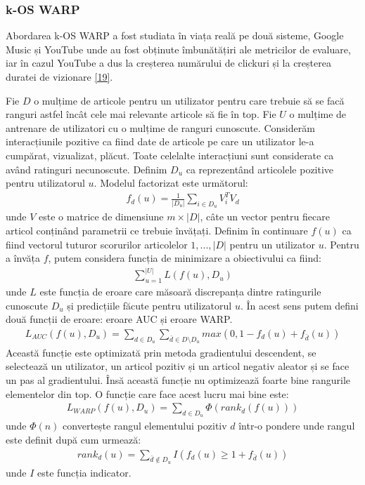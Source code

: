 \vspace{5mm}
\subsubsection*{k-OS WARP}
Abordarea k-OS WARP a fost studiata în viața reală pe două sisteme, Google Music și YouTube unde au fost obținute îmbunătățiri ale metricilor de evaluare, iar în cazul YouTube a dus la creșterea numărului de clickuri și la creșterea duratei de vizionare \hyperlink{jasonkos}{[19]}.

Fie $D$ o mulțime de articole pentru un utilizator pentru care trebuie să se facă ranguri astfel încât cele mai relevante articole să fie în top. Fie $U$ o mulțime de antrenare de utilizatori cu o mulțime de ranguri cunoscute. Considerăm interacțiunile pozitive ca fiind date de articole pe care un utilizator le-a cumpărat, vizualizat, plăcut. Toate celelalte interacțiuni sunt considerate ca având ratinguri necunoscute. Definim $D_u$ ca reprezentând articolele pozitive pentru utilizatorul $u$. Modelul factorizat este următorul:
\begin{align}
	f_d(u) = \frac{1}{|D_u|} \sum_{i \in D_u} V_i^T V_d
\end{align}
unde $V$ este o matrice de dimensiune $m \times |D|$, câte un vector pentru fiecare articol conținând parametrii ce trebuie învățați. Definim în continuare $f(u)$ ca fiind vectorul tuturor scorurilor articolelor $1,...,|D|$ pentru un utilizator $u$. Pentru a învăța $f$, putem considera funcția de minimizare a obiectivului ca fiind:
\begin{align}
	\sum_{u=1}^{|U|}L(f(u),D_u)
\end{align}
unde $L$ este funcția de eroare care măsoară discrepanța dintre ratingurile cunoscute $D_u$ și predicțiile făcute pentru utilizatorul $u$. În acest sens putem defini două funcții de eroare: eroare AUC și eroare WARP.
\begin{align}
	L_{AUC}(f(u),D_u) = \sum_{d \in D_u} \sum_{\bar{d} \in D \setminus D_u} max(0, 1 - f_d(u) + f_{\bar{d}}(u))
\end{align}
Această funcție este optimizată prin metoda gradientului descendent, se selectează un utilizator, un articol pozitiv și un articol negativ aleator și se face un pas al gradientului.
Însă această funcție nu optimizează foarte bine rangurile elementelor din top. O funcție care face acest lucru mai bine este:
\begin{align}
	L_{WARP}(f(u), D_u) = \sum_{d \in D_u} \Phi(rank_d(f(u)))
\end{align}
unde $\Phi(n)$ convertește rangul elementului pozitiv $d$ într-o pondere unde rangul este definit după cum urmează:
\begin{align}
	rank_d{(u)} = \sum_{\bar{d} \not\in D_u} I(f_d(u) \geq 1 + f_{\bar{d}}(u))
\end{align}
unde $I$ este funcția indicator.

